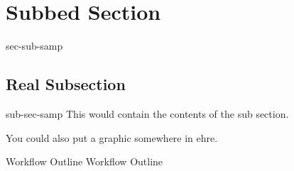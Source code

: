 \section{Subbed Section}{sec-sub-samp}%
\subsection{Real Subsection}{sub-sec-samp}%
This would contain the contents of the sub section.

You could also put a graphic somewhere in ehre.

  {Workflow Outline}
  {Workflow Outline}

\bye
